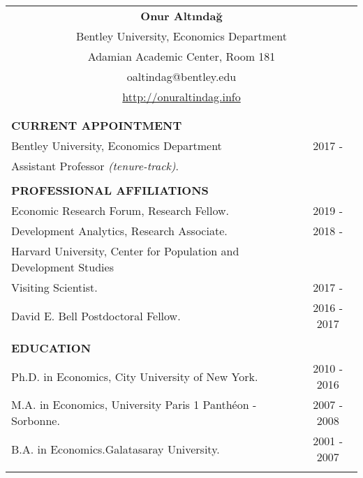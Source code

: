 \documentclass[12 pt]{article}
\begin{document}
\begin{longtable}{ccccc}



\multicolumn{5}{c}{\Large{\textbf{Onur Alt{\i}nda\u{g}}}}     \\



\multicolumn{5}{c}{Bentley University, Economics Department}    \\
\multicolumn{5}{c}{Adamian Academic Center, Room 181}   \\
\multicolumn{5}{c}{oaltindag@bentley.edu}   \\
\multicolumn{5}{c}{\url{http://onuraltindag.info}}   \\
\\
\\
\multicolumn{5}{l}{\textbf{CURRENT APPOINTMENT}}  \\[2 pt]
 \multicolumn{4}{l}{Bentley University, Economics Department} & \multicolumn{1}{c}{2017 - \phantom{2016}} \\
 \multicolumn{4}{l}{Assistant Professor \textit{(tenure-track)}.} \\

\\

 \multicolumn{5}{l}{\textbf{PROFESSIONAL AFFILIATIONS}}  \\[2 pt]


   \multicolumn{4}{l}{Economic Research Forum, Research Fellow.} & \multicolumn{1}{c}{2019 - \phantom{2016}} \\



  \multicolumn{4}{l}{Development Analytics, Research Associate.} & \multicolumn{1}{c}{2018 - \phantom{2016}} \\


  \multicolumn{4}{l}{Harvard University, Center for Population and Development Studies} \\
 \multicolumn{4}{l}{\phantom{00}Visiting Scientist.} & \multicolumn{1}{c}{2017 - \phantom{2016}} \\ 
 \multicolumn{4}{l}{\phantom{00}David E. Bell Postdoctoral Fellow.} & \multicolumn{1}{c}{2016 - 2017}  \\
\\


\multicolumn{5}{l}{\textbf{EDUCATION}}\\[2 pt]
  \multicolumn{4}{l}{Ph.D. in Economics, City University of New York.}  & \multicolumn{1}{c}{2010 - 2016}      \\
    \multicolumn{4}{l}{M.A. in Economics, University Paris 1 Panth\'{e}on - Sorbonne. } 
    & \multicolumn{1}{c}{2007 - 2008}    \\
\multicolumn{4}{l}{B.A. in Economics.Galatasaray University.}  & \multicolumn{1}{c}{2001 - 2007} \\
\\


\end{longtable}
\end{document}
